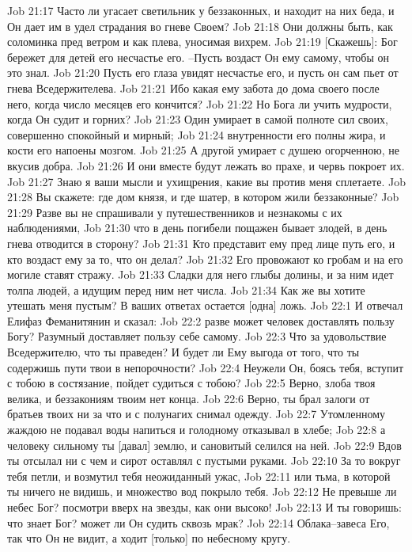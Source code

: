 Job 21:17  Часто ли угасает светильник у беззаконных, и находит на них беда, и Он дает им в удел страдания во гневе Своем?
Job 21:18  Они должны быть, как соломинка пред ветром и как плева, уносимая вихрем.
Job 21:19  [Скажешь]: Бог бережет для детей его несчастье его. --Пусть воздаст Он ему самому, чтобы он это знал.
Job 21:20  Пусть его глаза увидят несчастье его, и пусть он сам пьет от гнева Вседержителева.
Job 21:21  Ибо какая ему забота до дома своего после него, когда число месяцев его кончится?
Job 21:22  Но Бога ли учить мудрости, когда Он судит и горних?
Job 21:23  Один умирает в самой полноте сил своих, совершенно спокойный и мирный;
Job 21:24  внутренности его полны жира, и кости его напоены мозгом.
Job 21:25  А другой умирает с душею огорченною, не вкусив добра.
Job 21:26  И они вместе будут лежать во прахе, и червь покроет их.
Job 21:27  Знаю я ваши мысли и ухищрения, какие вы против меня сплетаете.
Job 21:28  Вы скажете: где дом князя, и где шатер, в котором жили беззаконные?
Job 21:29  Разве вы не спрашивали у путешественников и незнакомы с их наблюдениями,
Job 21:30  что в день погибели пощажен бывает злодей, в день гнева отводится в сторону?
Job 21:31  Кто представит ему пред лице путь его, и кто воздаст ему за то, что он делал?
Job 21:32  Его провожают ко гробам и на его могиле ставят стражу.
Job 21:33  Сладки для него глыбы долины, и за ним идет толпа людей, а идущим перед ним нет числа.
Job 21:34  Как же вы хотите утешать меня пустым? В ваших ответах остается [одна] ложь.
Job 22:1  И отвечал Елифаз Феманитянин и сказал:
Job 22:2  разве может человек доставлять пользу Богу? Разумный доставляет пользу себе самому.
Job 22:3  Что за удовольствие Вседержителю, что ты праведен? И будет ли Ему выгода от того, что ты содержишь пути твои в непорочности?
Job 22:4  Неужели Он, боясь тебя, вступит с тобою в состязание, пойдет судиться с тобою?
Job 22:5  Верно, злоба твоя велика, и беззакониям твоим нет конца.
Job 22:6  Верно, ты брал залоги от братьев твоих ни за что и с полунагих снимал одежду.
Job 22:7  Утомленному жаждою не подавал воды напиться и голодному отказывал в хлебе;
Job 22:8  а человеку сильному ты [давал] землю, и сановитый селился на ней.
Job 22:9  Вдов ты отсылал ни с чем и сирот оставлял с пустыми руками.
Job 22:10  За то вокруг тебя петли, и возмутил тебя неожиданный ужас,
Job 22:11  или тьма, в которой ты ничего не видишь, и множество вод покрыло тебя.
Job 22:12  Не превыше ли небес Бог? посмотри вверх на звезды, как они высоко!
Job 22:13  И ты говоришь: что знает Бог? может ли Он судить сквозь мрак?
Job 22:14  Облака--завеса Его, так что Он не видит, а ходит [только] по небесному кругу.
